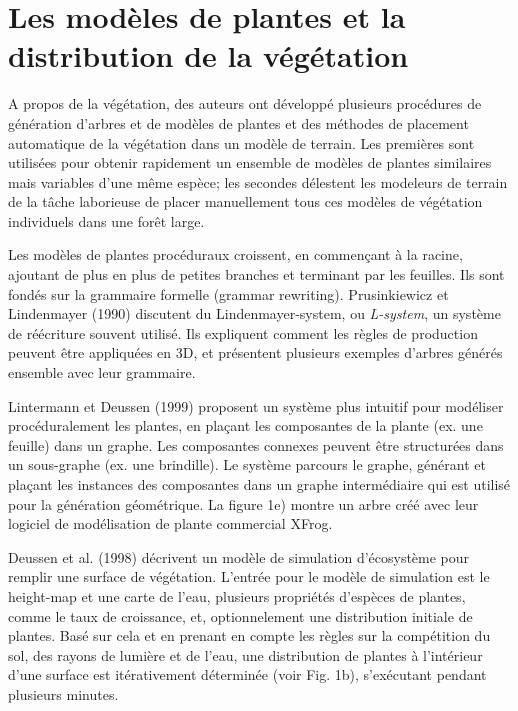 \documentclass[11pt]{report}
\begin{document}
\section{Les modèles de plantes et la distribution de la végétation}

A propos de la végétation, des auteurs ont développé plusieurs procédures de génération d'arbres et de modèles de plantes et des méthodes de placement automatique de la végétation dans un modèle de terrain. Les premières sont utilisées pour obtenir rapidement un ensemble de modèles de plantes similaires mais variables d'une même espèce; les secondes délestent les modeleurs de terrain de la tâche laborieuse de placer manuellement tous ces modèles de végétation individuels dans une forêt large. \newline

Les modèles de plantes procéduraux croissent, en commençant à la racine, ajoutant de plus en plus de petites branches et terminant par les feuilles. Ils sont fondés sur la grammaire formelle (grammar rewriting). Prusinkiewicz et Lindenmayer (1990) discutent du Lindenmayer-system, ou \textit{L-system}, un système de réécriture souvent utilisé. Ils expliquent comment les règles de production peuvent être appliquées en 3D, et présentent plusieurs exemples d'arbres générés ensemble avec leur grammaire. \newline

Lintermann et Deussen (1999) proposent un système plus intuitif  pour modéliser procéduralement les plantes, en plaçant les composantes de la plante (ex. une feuille) dans un graphe. Les composantes connexes peuvent être structurées dans un sous-graphe (ex. une brindille). Le système parcours le graphe, générant et plaçant les instances des composantes dans un graphe intermédiaire qui est utilisé pour la génération géométrique. La figure 1e) montre un arbre créé avec leur logiciel de modélisation de plante commercial XFrog.\newline

Deussen et al. (1998) décrivent un  modèle de simulation d'écosystème pour remplir une surface de végétation. L'entrée pour le modèle de simulation est le height-map et une carte de l'eau, plusieurs propriétés d'espèces de plantes, comme le taux de croissance, et, optionnelement une distribution initiale de plantes. Basé sur cela et en prenant en compte  les règles sur la compétition du sol, des rayons de lumière et de l'eau, une distribution de plantes à l'intérieur d'une surface est itérativement déterminée (voir Fig. 1b), s'exécutant pendant plusieurs minutes. \newline
\end{document}
